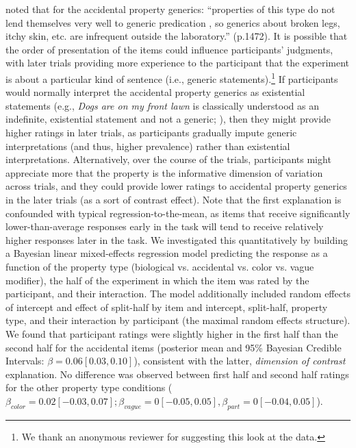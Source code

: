 \documentclass[floatsintext,man]{apa6}
\let\rmarkdownfootnote\footnote%
\def\footnote{\protect\rmarkdownfootnote}
\begin{document}
  noted that for the accidental property generics: \enquote{properties of this type do not lend themselves very well to generic predication \cite{gelman1988development, Cimpian2008}, so generics about broken legs, itchy skin, etc. are infrequent outside the laboratory.} (p.1472). It is possible that the order of presentation of the items could influence participants' judgments, with later trials providing more experience to the participant that the experiment is about a particular kind of sentence (i.e., generic statements).\footnote{We thank an anonymous reviewer for suggesting this look at the data.} 
 If participants would normally interpret the accidental property generics as existential statements (e.g., \emph{Dogs are on my front lawn} is classically understood as an indefinite, existential statement and not a generic; ), then they might provide higher ratings in later trials, as participants gradually impute generic interpretations (and thus, higher prevalence) rather than existential interpretations.
 Alternatively, over the course of the trials, participants might appreciate more that the property is the informative dimension of variation across trials, and they could provide lower ratings to accidental property generics in the later trials (as a sort of contrast effect). 
 Note that the first explanation is confounded with typical regression-to-the-mean, as items that receive significantly lower-than-average responses early in the task will tend to receive relatively higher responses later in the task. We investigated this quantitatively by building a Bayesian linear mixed-effects regression model predicting the response as a function of the property type (biological vs. accidental vs. color vs. vague modifier), the half of the experiment in which the item was rated by the participant, and their interaction. The model additionally included random effects of intercept and effect of split-half by item and intercept, split-half, property type, and their interaction by participant (the maximal random effects structure). We found that participant ratings were slightly higher in the first half than the second half for the accidental items (posterior mean and 95\% Bayesian Credible Intervals: $\beta = 0.06 [0.03, 0.10]$), consistent with the latter, \emph{dimension of contrast} explanation. No difference was observed between first half and second half ratings for the other property type conditions ($\beta_{color} = 0.02 [-0.03, 0.07]; \beta_{vague} = 0 [-0.05, 0.05], \beta_{part} = 0 [-0.04, 0.05]$).
 
\end{document}
